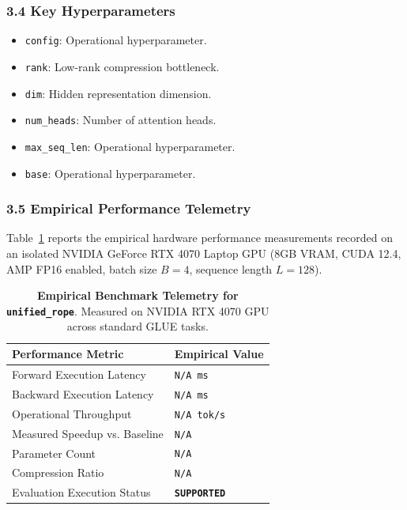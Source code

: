 \subsubsection*{3.4 Key Hyperparameters}
\begin{itemize}
    \item \texttt{config}: Operational hyperparameter.
    \item \texttt{rank}: Low-rank compression bottleneck.
    \item \texttt{dim}: Hidden representation dimension.
    \item \texttt{num\_heads}: Number of attention heads.
    \item \texttt{max\_seq\_len}: Operational hyperparameter.
    \item \texttt{base}: Operational hyperparameter.
\end{itemize}

\subsubsection*{3.5 Empirical Performance Telemetry}
Table~\ref{tab:telemetry_unified_rope} reports the empirical hardware performance measurements recorded on an isolated NVIDIA GeForce RTX 4070 Laptop GPU (8GB VRAM, CUDA 12.4, AMP FP16 enabled, batch size $B=4$, sequence length $L=128$).

\begin{table}[h]
\centering
\small
\caption{\textbf{Empirical Benchmark Telemetry for \texttt{unified\_rope}}. Measured on NVIDIA RTX 4070 GPU across standard GLUE tasks.}
\label{tab:telemetry_unified_rope}
\begin{tabularx}{\columnwidth}{lX}
\toprule
\textbf{Performance Metric} & \textbf{Empirical Value} \\
\midrule
Forward Execution Latency & \texttt{N/A ms} \\
Backward Execution Latency & \texttt{N/A ms} \\
Operational Throughput & \texttt{N/A tok/s} \\
Measured Speedup vs. Baseline & \texttt{N/A} \\
Parameter Count & \texttt{N/A} \\
Compression Ratio & \texttt{N/A} \\
Evaluation Execution Status & \textbf{\texttt{SUPPORTED}} \\
\bottomrule
\end{tabularx}
\end{table}

